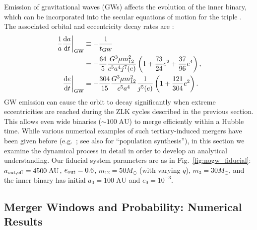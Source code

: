 \documentclass[
        fleqn,
        usenatbib,
    ]{mnras}
\newcommand*{\rd}[2]{\frac{\mathrm{d}#1}{\mathrm{d}#2}}
\newcommand*{\at}[1]{\left.#1\right|}
\newcommand*{\p}[1]{\left(#1\right)}
\begin{document}
Emission of gravitational waves (GWs) affects the evolution of the inner
binary, which can be incorporated into the secular equations of motion for the
triple \citep[e.g.,]{peters1964, LL18}. The associated orbital and eccentricity
decay rates are \citep{peters1964}:
\begin{align}
    \at{\frac{1}{a}\rd{a}{t}}_{\rm GW} &\equiv -\frac{1}{t_{\rm GW}}\nonumber\\
        &= -\frac{64}{5}\frac{G^3 \mu m_{12}^2}{c^5a^4j^7(e)}
            \p{1 + \frac{73}{24}e^2 + \frac{37}{96}e^4}\label{eq:def_tgw},\\
    \at{\rd{e}{t}}_{\rm GW} &= -\frac{304}{15}\frac{G^3 \mu m_{12}^2}{c^5a^4}
        \frac{1}{j^{5}(e)}\p{1 + \frac{121}{304}e^2}\label{eq:dedt_gw}.
\end{align}
GW emission can cause the orbit to decay significantly when extreme
eccentricities are reached during the ZLK cycles described in the previous
section. This allows even wide binaries ($\sim 100\;\mathrm{AU}$) to merge
efficiently within a Hubble time. While various numerical examples of such
tertiary-induced mergers have been given before (e.g.\ \citet{LL18}; see also
\citet{LL19} for ``population synthesis''), in this section we examine the
dynamical process in detail in order to develop an analytical understanding.
Our fiducial system parameters are as in Fig.~\ref{fig:nogw_fiducial}:
$a_{\rm out, eff} = 4500\;\mathrm{AU}$, $e_{\rm out} =
0.6$, $m_{12} = 50M_{\odot}$ (with varying $q$), $m_3 = 30M_{\odot}$, and the
inner binary has initial $a_0 = 100\;\mathrm{AU}$ and $e_0 = 10^{-3}$.

\subsection{Merger Windows and Probability: Numerical Results}\label{ss:windows}
\end{document}

